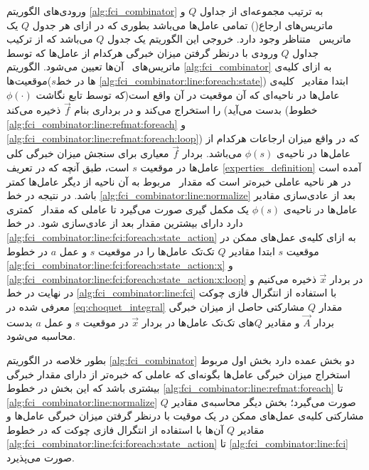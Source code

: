 ورودی‌های الگوریتم
\ref{alg:fci_combinator}
به ترتیب مجموعه‌ای از جداول $Q$ و ماتریس‌های ارجاع() تمامی عامل‌ها می‌باشد بطوری که در ازای هر جدول $Q$ یک ماتریس \ متناظر وجود دارد. خروجی این الگوریتم یک جدول $Q$ می‌باشد که از ترکیب جداول $Q$ ورودی با درنظر گرفتن میزان خبرگی هرکدام از عامل‌ها که توسط ماتریس‌های \ آن‌ها تعیین می‌شود. الگوریتم
\ref{alg:fci_combinator}
به ازای کلیه‌ی موقعیت‌ها($s$ها در خط \ref{alg:fci_combinator:line:foreach:state}) ابتدا مقادیر \ کلیه‌ی عامل‌ها در ناحیه‌ای که آن موقعیت در آن واقع است(که توسط تابع نگاشت $\phi(\cdot)$ بدست می‌آید) را استخراج می‌کند و در برداری بنام $\vec{f}$ ذخیره می‌کند (خطوط \ref{alg:fci_combinator:line:refmat:foreach} و \ref{alg:fci_combinator:line:refmat:foreach:loop}) که در واقع میزان ارجاعات هرکدام از عامل‌ها در ناحیه‌ی $\phi(s)$ می‌باشد. بردار $\vec{f}$ معیاری برای سنجش میزان خبرگی کلی عامل‌ها در موقعیت $s$ است، طبق آنچه که در تعریف
\ref{experties_definition}
آمده است در هر ناحیه‌ عاملی خبره‌تر است که مقدار \ مربوط به آن ناحیه از دیگر عامل‌ها کمتر باشد. در نتیجه در خط \ref{alg:fci_combinator:line:normalize} بعد از عادی‌سازی مقادیر \ عامل‌ها در ناحیه‌ی $\phi(s)$ یک مکمل‌ گیری صورت می‌گیرد تا عاملی که مقدار \ کمتری دارد دارای بیشترین مقدار بعد از عادی‌سازی شود. در خط \ref{alg:fci_combinator:line:fci:foreach:state_action} به ازای کلیه‌ی عمل‌های ممکن در موقعیت $s$ ابتدا مقادیر $Q$ تک‌تک عامل‌ها را در موقعیت $s$ و عمل $a$ در خطوط \ref{alg:fci_combinator:line:fci:foreach:state_action:x} و \ref{alg:fci_combinator:line:fci:foreach:state_action:x:loop} در بردار $\vec{x}$ ذخیره می‌کنیم و در نهایت در خط \ref{alg:fci_combinator:line:fci} با استفاده از انتگرال فازی چوکت معرفی شده در \ref{eq:choquet_integral} مقدار $Q$ مشارکتی حاصل از میزان خبرگی بردار $\vec{A}$ و مقادیر $Q$‌های تک‌تک عامل‌ها در بردار $\vec{x}$ در موقعیت $s$ و عمل $a$ بدست محاسبه می‌شود.

بطور خلاصه در الگوریتم \ref{alg:fci_combinator} دو بخش عمده دارد بخش اول مربوط استخراج میزان خبرگی عامل‌ها بگونه‌ای که عاملی که خبره‌تر از دارای مقدار خبرگی بیشتری باشد که این بخش در خطوط \ref{alg:fci_combinator:line:refmat:foreach} تا \ref{alg:fci_combinator:line:normalize} صورت می‌گیرد؛ بخش دیگر محاسبه‌ی مقادیر $Q$ مشارکتی کلیه‌ی عمل‌های ممکن در یک موقیت با درنظر گرفتن میزان خبرگی عامل‌ها و مقادیر $Q$ آن‌ها با استفاده از انتگرال فازی چوکت که در خطوط \ref{alg:fci_combinator:line:fci:foreach:state_action} تا \ref{alg:fci_combinator:line:fci} صورت می‌پذیرد.

